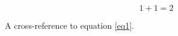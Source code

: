 \begin{equation} \label{eq1}
    1 + 1 = 2 %
\end{equation}

A cross-reference to equation \eqref{eq1}. %
